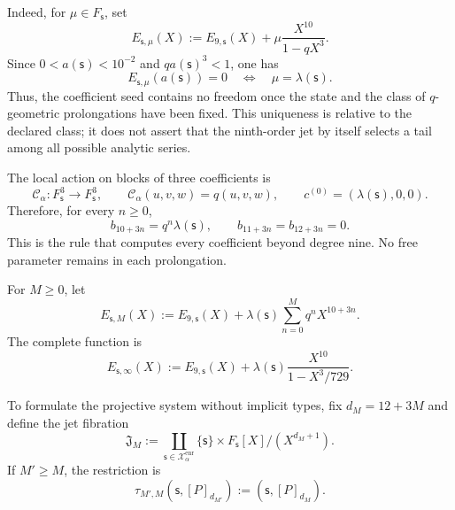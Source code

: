 Indeed, for \(\mu\in F_{\mathsf s}\), set
\[
 E_{\mathsf s,\mu}(X)
 :=E_{9,\mathsf s}(X)+\mu\frac{X^{10}}{1-qX^3}.
\]
Since \(0<a(\mathsf s)<10^{-2}\) and \(qa(\mathsf s)^3<1\), one has
\begin{equation}
 E_{\mathsf s,\mu}(a(\mathsf s))=0
 \quad\Longleftrightarrow\quad
 \mu=\lambda(\mathsf s).
 \label{eq:alpha-unicidad-lambda-clase-geometrica}
\end{equation}
Thus, the coefficient seed contains no freedom once the state and the class
of \(q\)-geometric prolongations have been fixed. This uniqueness is relative
to the declared class; it does not assert that the ninth-order jet by itself
selects a tail among all possible analytic series.

The local action on blocks of three coefficients is
\begin{equation}
 \mathcal C_\alpha:F_{\mathsf s}^{3}\longrightarrow F_{\mathsf s}^{3},
 \qquad \mathcal C_\alpha(u,v,w)=q(u,v,w),
 \qquad c^{(0)}=(\lambda(\mathsf s),0,0).
 \label{eq:alpha-accion-coeficientes}
\end{equation}
Therefore, for every \(n\geq0\),
\begin{equation}
 b_{10+3n}=q^n\lambda(\mathsf s),\qquad
 b_{11+3n}=b_{12+3n}=0.
 \label{eq:alpha-recurrencia-coeficientes}
\end{equation}
This is the rule that computes every coefficient beyond degree nine. No free
parameter remains in each prolongation.

For \(M\geq0\), let
\begin{equation}
 E_{\mathsf s,M}(X):=E_{9,\mathsf s}(X)
 +\lambda(\mathsf s)\sum_{n=0}^{M}q^nX^{10+3n}.
 \label{eq:alpha-truncamientos-completos}
\end{equation}
The complete function is
\begin{equation}
 E_{\mathsf s,\infty}(X)
 :=E_{9,\mathsf s}(X)
 +\lambda(\mathsf s)\frac{X^{10}}{1-X^3/729}.
 \label{eq:alpha-funcion-completa-explicita}
\end{equation}

To formulate the projective system without implicit types, fix
\(d_M=12+3M\) and define the jet fibration
\begin{equation}
 \mathfrak J_M:=
 \coprod_{\mathsf s\in\mathcal X_\alpha^{\mathrm{enr}}}
 \{\mathsf s\}\times F_{\mathsf s}[X]/(X^{d_M+1}).
 \label{eq:alpha-espacio-jets-rev08}
\end{equation}
If \(M'\ge M\), the restriction is
\begin{equation}
 \tau_{M',M}(\mathsf s,[P]_{d_{M'}})
 :=(\mathsf s,[P]_{d_M}).
 \label{eq:alpha-truncamiento-jets-rev08}
\end{equation}

